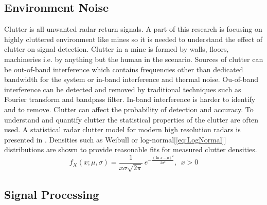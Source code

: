 \subsection{Environment Noise}
Clutter is all unwanted radar return signals. A part of this research is focusing on highly cluttered environment like mines so it is needed to understand the effect of clutter on signal detection. Clutter in a mine is formed by walls, floors, machineries i.e. by anything but the human in the scenario. Sources of clutter can be out-of-band interference which contains frequencies other than dedicated bandwidth for the system or in-band interference and thermal noise. Ou-of-band interference can be detected and removed by traditional techniques such as Fourier transform and bandpass filter. In-band interference is harder to identify and to remove. Clutter can affect the probability of detection and accuracy. To understand and quantify clutter the statistical properties of the clutter are often used. A statistical radar clutter model for modern high resolution radars is presented in \cite{clutterModel}. Densities such as Weibull or log-normal[\ref{eq:LogNormal}] distributions are shown to provide reasonable fits for measured clutter densities.
\begin{equation}
f_X(x;\mu,\sigma) = \frac{1}{ x\sigma \sqrt{2 \pi}}\, e^{-\frac{(\ln x - \mu)^2}{2\sigma^2}},\ \ x>0
\label{eq:LogNormal}
\end{equation}

\subsection{Signal Processing}

